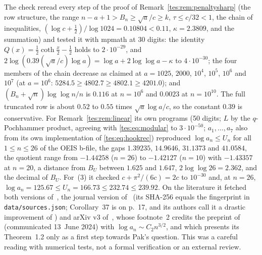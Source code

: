 \documentclass[11pt,a4paper]{article}
\theoremstyle{remark}\newtheorem{remark}[theorem]{Remark}
\numberwithin{equation}{section}
\begin{document}
The check reread every step of the proof of
Remark~\ref{tes:rem:penaltysharp} (the row structure, the range
$n-a+1>B_n\ge\sqrt a/c\ge k$, $\tau\le c/32<1$, the chain of inequalities,
$(\log c+\frac12)/\log1024=0.10804<0.11$, $\kappa=2.3809$, and the
summation) and tested it with \textsf{mpmath} at 30 digits: the identity
$Q(x)=\frac12\coth\frac x2-\frac12$ holds to $2\cdot10^{-29}$, and
$2\log(0.39(\sqrt a/c)\log a)=\log a+2\log\log a-\kappa$ to
$4\cdot10^{-30}$; the four members of the chain decrease as claimed at
$a=1025$, $2000$, $10^4$, $10^5$, $10^6$ and $10^7$ (at $a=10^6$:
$5284.5\ge4802.7\ge4802.1\ge4201.0$); and $(B_n+\sqrt n)\log\log n/n$ is
$0.116$ at $n=10^6$ and $0.0023$ at $n=10^{10}$. The full truncated row is
about $0.52$ to $0.55$ times $\sqrt a\log a/c$, so the constant $0.39$ is
conservative. For Remark~\ref{tes:rem:linear} its own programs (50 digits;
$L$ by the $q$-Pochhammer product, agreeing with \eqref{tes:eq:modular} to
$3\cdot10^{-50}$; $a_1,\ldots,a_7$ also from its own implementation of
\eqref{tes:eq:hookrec}) reproduced $\log a_n\le U_n$ for all $1\le n\le26$
of the OEIS b-file, the gaps $1.39235$, $14.9646$, $31.1373$ and $41.0584$,
the quotient range from $-1.44258$ ($n=26$) to $-1.42127$ ($n=10$) with
$-1.43357$ at $n=20$, a distance from $B_U$ between $1.625$ and $1.647$,
$2\log\log26=2.362$, and the decimal of $B_U$. For~(3) it checked
$c+\pi^2/(6c)=2c$ to $10^{-30}$ and, at $n=26$,
$\log a_n=125.67\le U_n=166.73\le232.74\le239.92$. On the literature it
fetched both versions of~\cite{oneill}, the journal version of~\cite{bbm}
(its SHA-256 equals the fingerprint in \nolinkurl{data/sources.json};
Corollary~37 is on p.~17, and its authors call it a drastic improvement of
\cite[Theorem~1.2]{lm}) and arXiv v3 of~\cite{lm}, whose footnote~2
credits the preprint of~\cite{bbm} (communicated 13~June 2024) with
$\log a_n\sim C_2n^{3/2}$, and which presents its Theorem~1.2 only as a
first step towards Pak's question. This was a careful reading with
numerical tests, not a formal verification or an external review.
\end{document}
